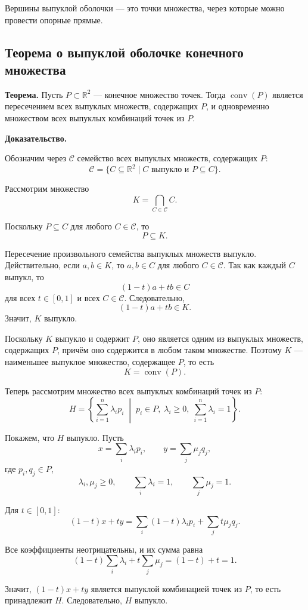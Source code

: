 \documentclass[12pt,a4paper]{article}
\begin{document}
Вершины выпуклой оболочки — это точки множества, через которые можно провести опорные прямые.

\subsection{Теорема о выпуклой оболочке конечного множества}

\textbf{Теорема.}
Пусть \(P\subset\mathbb{R}^2\) — конечное множество точек. Тогда \(\operatorname{conv}(P)\) является пересечением всех выпуклых множеств, содержащих \(P\), и одновременно множеством всех выпуклых комбинаций точек из \(P\).

\textbf{Доказательство.}

Обозначим через \(\mathcal{C}\) семейство всех выпуклых множеств, содержащих \(P\):
\[
\mathcal{C}=\{C\subseteq\mathbb{R}^2\mid C \text{ выпукло и } P\subseteq C\}.
\]

Рассмотрим множество
\[
K=\bigcap_{C\in\mathcal{C}} C.
\]

Поскольку \(P\subseteq C\) для любого \(C\in\mathcal{C}\), то
\[
P\subseteq K.
\]

Пересечение произвольного семейства выпуклых множеств выпукло. Действительно, если \(a,b\in K\), то \(a,b\in C\) для любого \(C\in\mathcal{C}\). Так как каждый \(C\) выпукл, то
\[
(1-t)a+tb\in C
\]
для всех \(t\in[0,1]\) и всех \(C\in\mathcal{C}\). Следовательно,
\[
(1-t)a+tb\in K.
\]
Значит, \(K\) выпукло.

Поскольку \(K\) выпукло и содержит \(P\), оно является одним из выпуклых множеств, содержащих \(P\), причём оно содержится в любом таком множестве. Поэтому \(K\) — наименьшее выпуклое множество, содержащее \(P\), то есть
\[
K=\operatorname{conv}(P).
\]

Теперь рассмотрим множество всех выпуклых комбинаций точек из \(P\):
\[
H=
\left\{
\sum_{i=1}^{n}\lambda_i p_i
\;\middle|\;
p_i\in P,\;
\lambda_i\ge 0,\;
\sum_{i=1}^{n}\lambda_i=1
\right\}.
\]

Покажем, что \(H\) выпукло. Пусть
\[
x=\sum_i\lambda_i p_i,
\qquad
y=\sum_j\mu_j q_j,
\]
где \(p_i,q_j\in P\),
\[
\lambda_i,\mu_j\ge 0,
\qquad
\sum_i\lambda_i=1,
\qquad
\sum_j\mu_j=1.
\]

Для \(t\in[0,1]\):
\[
(1-t)x+ty
=
\sum_i (1-t)\lambda_i p_i
+
\sum_j t\mu_j q_j.
\]

Все коэффициенты неотрицательны, и их сумма равна
\[
(1-t)\sum_i\lambda_i+t\sum_j\mu_j
=
(1-t)+t=1.
\]

Значит, \((1-t)x+ty\) является выпуклой комбинацией точек из \(P\), то есть принадлежит \(H\). Следовательно, \(H\) выпукло.
\end{document}
